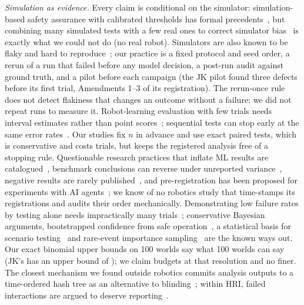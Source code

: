 \emph{Simulation as evidence.} Every claim is conditional on the simulator: simulation-based safety assurance with calibrated thresholds has formal precedents~\cite{luo2021conformalsim}, but combining many simulated tests with a few real ones to correct simulator bias~\cite{badithela2025suresim} is exactly what we could not do (no real robot). Simulators are also known to be flaky and hard to reproduce~\cite{amini2023flaky,afzal2020challenges}; our practice is a fixed protocol and seed order, a rerun of a run that failed before any model decision, a post-run audit against ground truth, and a pilot before each campaign (the JK pilot found three defects before its first trial, Amendments 1--3 of its registration). The rerun-once rule does not detect flakiness that changes an outcome without a failure; we did not repeat runs to measure it. Robot-learning evaluation with few trials needs interval estimates rather than point scores~\cite{agarwal2021precipice,vincent2024bcstat}; sequential tests can stop early at the same error rates~\cite{snyder2026beyondbinary}. Our studies fix $n$ in advance and use exact paired tests, which is conservative and costs trials, but keeps the registered analysis free of a stopping rule. Questionable research practices that inflate ML results are catalogued~\cite{leech2024questionable}, benchmark conclusions can reverse under unreported variance~\cite{bouthillier2021variance}, negative results are rarely published~\cite{karl2024negative}, and pre-registration has been proposed for experiments with AI agents~\cite{vaccaro2026prereg}; we know of no robotics study that time-stamps its registrations and audits their order mechanically. Demonstrating low failure rates by testing alone needs impractically many trials~\cite{zhao2019roadtesting}; conservative Bayesian arguments, bootstrapped confidence from safe operation~\cite{bishop2021bootstrapping}, a statistical basis for scenario testing~\cite{zhao2025scenariostats} and rare-event importance sampling~\cite{okelly2018rareevent} are the known ways out. Our exact binomial upper bounds on 100 worlds say what 100 worlds can say (JK's \JKAdaptRate{} has an upper bound of \JKAdaptUpper); we claim budgets at that resolution and no finer. The closest mechanism we found outside robotics commits analysis outputs to a time-ordered hash tree as an alternative to blinding~\cite{casas2024topo}; within HRI, failed interactions are argued to deserve reporting~\cite{axelsson2025failedinteractions}.
